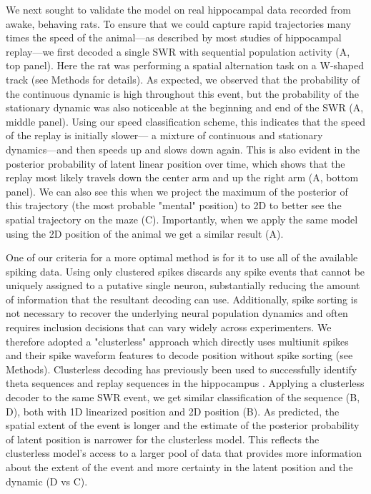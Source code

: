\documentclass[9pt,lineno]{elife}
\begin{document}
We next sought to validate the model on real hippocampal data recorded from awake, behaving rats. To ensure that we could capture rapid trajectories many times the speed of the animal---as described by most studies of hippocampal replay---we first decoded a single SWR with sequential population activity (A, top panel). Here the rat was performing a spatial alternation task on a W-shaped track (see Methods for details). As expected, we observed that the probability of the continuous dynamic is high throughout this event, but the probability of the stationary dynamic was also noticeable at the beginning and end of the SWR (A, middle panel). Using our speed classification scheme, this indicates that the speed of the replay is initially slower--- a mixture of continuous and stationary dynamics---and then speeds up and slows down again. This is also evident in the posterior probability of latent linear position over time, which shows that the replay most likely travels down the center arm and up the right arm (A, bottom panel). We can also see this when we project the maximum of the posterior of this trajectory (the most probable "mental" position) to 2D to better see the spatial trajectory on the maze (C). Importantly, when we apply the same model using the 2D position of the animal we get a similar result (A).

One of our criteria for a more optimal method is for it to use all of the available spiking data. Using only clustered spikes discards any spike events that cannot be uniquely assigned to a putative single neuron, substantially reducing the amount of information that the resultant decoding can use. Additionally, spike sorting is not necessary to recover the underlying neural population dynamics \citep{TrautmannAccurateEstimationNeural2019} and often requires inclusion decisions that can vary widely across experimenters. We therefore adopted a "clusterless" approach which directly uses multiunit spikes and their spike waveform features to decode position without spike sorting (see Methods). Clusterless decoding has previously been used to successfully identify theta sequences and replay sequences in the hippocampus \citep{ChenTransductiveneuraldecoding2012, KloostermanBayesiandecodingusing2014, DengRapidclassificationhippocampal2016, KayConstantSubsecondCycling2020}. Applying a clusterless decoder to the same SWR event, we get similar classification of the sequence (B, D), both with 1D linearized position and 2D position (B). As predicted, the spatial extent of the event is longer and the estimate of the posterior probability of latent position is narrower for the clusterless model. This reflects the clusterless model's access to a larger pool of data that provides more information about the extent of the event and more certainty in the latent position and the dynamic (D vs C).
\end{document}
